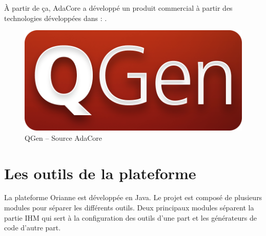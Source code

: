 À partir de ça, AdaCore a développé un produit commercial à partir des
technologies développées dans  : .

\begin{figure}[h]
  \centering
  \includegraphics[scale=0.2]{images/qgen}
  \caption{QGen -- Source AdaCore}
  \label{fig:qgen}
\end{figure}

\section{Les outils de la plateforme}
La plateforme Orianne est développée en Java. Le projet est composé de plusieurs modules pour séparer les différents outils.
Deux principaux modules séparent la partie IHM qui sert à la configuration des outils d'une part et les générateurs de code d'autre part.
